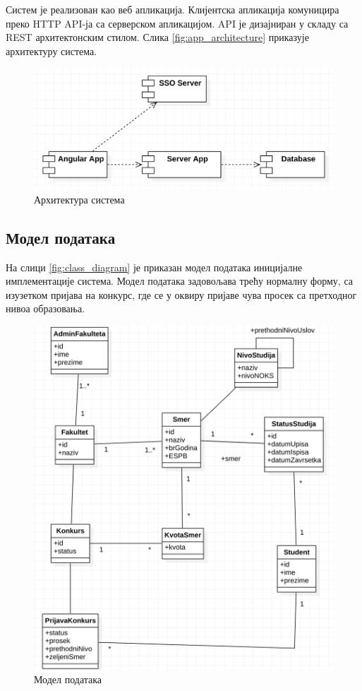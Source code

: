 \documentclass[a4paper]{article}
\begin{document}
Систем је реализован као веб апликација. Клијентска апликација комуницира преко HTTP API-ја са серверском апликацијом. API је
дизајниран у складу са REST архитектонским стилом\cite{rest}. Слика \autoref{fig:app_architecture} приказује архитектуру система.

\begin{figure}[H]
    \centering
    \includegraphics{images/app_architecture.png}
    \caption{Архитектура система}
    \label{fig:app_architecture}
\end{figure}

\subsection*{Модел података}

На слици \autoref{fig:class_diagram} је приказан модел података иницијалне имплементације система. Модел података задовољава трећу нормалну форму, са
изузетком пријава на конкурс, где се у оквиру пријаве чува просек са претходног нивоа образовања.

\begin{figure}[H]
    \centering
    \includegraphics{images/class_diagram.png}
    \caption{Модел података}
    \label{fig:class_diagram}
\end{figure}
\end{document}
